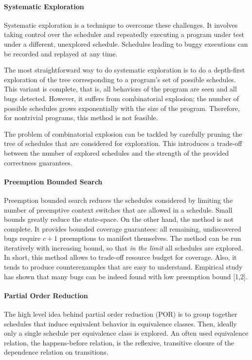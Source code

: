 \documentclass[]{article}
\begin{document}
\paragraph{Systematic Exploration}
Systematic exploration is a technique to overcome these challenges.
It involves taking control over the scheduler and repeatedly executing a program under test under a different, 
unexplored schedule.
Schedules leading to buggy executions can be recorded and replayed at any time.

The most straightforward way to do systematic exploration is to do a depth-first exploration of the tree corresponding
to a program's set of possible schedules.
This variant is complete, that is, all behaviors of the program are seen and all bugs detected.
However, it suffers from combinatorial explosion; the number of possible schedules grows exponentially with the size
of the program.
Therefore, for nontrivial programs, this method is not feasible.

The problem of combinatorial explosion can be tackled by carefully pruning the tree of schedules that are considered for
exploration.
This introduces a trade-off between the number of explored schedules and the strength of the provided correctness 
guarantees.

\paragraph{Preemption Bounded Search}
Preemption bounded search reduces the schedules considered by limiting the number of preemptive context switches that
are allowed in a schedule.
Small bounds greatly reduce the state-space.
On the other hand, the method is not complete.
It provides bounded coverage guarantees: all remaining, undiscovered bugs require $c+1$ preemptions to manifest
themselves.
The method can be run iteratively with increasing bound, so that \emph{in the limit} all schedules are explored.
In short, this method allows to trade-off resource budget for coverage.
Also, it tends to produce counterexamples that are easy to understand.
Empirical study has shown that many bugs can be indeed found with low preemption bound [1,2].

\paragraph{Partial Order Reduction}
The high level idea behind partial order reduction (POR) is to group together schedules that induce equivalent behavior 
in equivalence classes. Then, ideally only a single schedule per equivalence class is explored. An often used 
equivalence relation, the happens-before relation, is the reflexive, transitive closure of the dependence
relation on transitions.
\end{document}
